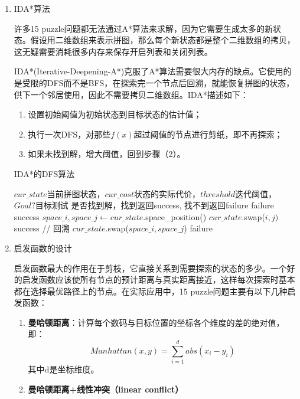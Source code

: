 \documentclass[10pt,letterpaper]{ctexart}
\begin{document}
\begin{enumerate}[itemindent=2.5em,label=\arabic*、]
    \item IDA*算法
    \par \qquad 许多15 puzzle问题都无法通过A*算法来求解，因为它需要生成太多的新状态。假设用二维数组来表示拼图，那么每个新状态都是整个二维数组的拷贝，这无疑需要消耗很多内存来保存开启列表和关闭列表。
    \par \qquad IDA*(Iterative-Deepening-A*)克服了A*算法需要很大内存的缺点。它使用的是受限的DFS而不是BFS，在探索完一个节点后回溯，就能恢复拼图的状态，供下一个邻居使用，因此不需要拷贝二维数组。IDA*描述如下：
    \begin{enumerate}[itemindent=1.5em,label=（\arabic*）]
        \item 设置初始阈值为初始状态到目标状态的估计值；
        \item 执行一次DFS，对那些$f(x)$超过阈值的节点进行剪纸，即不再探索；
        \item 如果未找到解，增大阈值，回到步骤（2）。
    \end{enumerate}

    \begin{algorithm}
      \caption{IDA*的DFS算法}
        \begin{algorithmic}[1] %
          \Require $cur\_state$当前拼图状态，$cur\_cost$状态的实际代价，$threshold$迭代阈值，$Goal?$目标测试
          \Ensure 是否找到解，找到返回success, 找不到返回failure
                \State \Return failure
              \EndIf
                \State \Return success
              \EndIf
              \State $space\_i, space\_j \gets cur\_state$.space\_position()
                \State $cur\_state$.swap($i, j)$
                  \State \Return success
                \EndIf
                \State // 回溯
                \State $cur\_state$.swap($space\_i, space\_j$)
              \EndFor
              \State \Return failure
            \EndFunction
        \end{algorithmic}
    \end{algorithm}
    \item 启发函数的设计
    \par \qquad 启发函数最大的作用在于剪枝，它直接关系到需要探索的状态的多少。一个好的启发函数应该使所有节点的预计距离与真实距离接近，这样每次探索时基本都在选择最优路径上的节点。在实际应用中，15 puzzle问题主要有以下几种启发函数：
    \begin{enumerate}[itemindent=1.5em,label=（\arabic*）]
      \item \textbf{曼哈顿距离}：计算每个数码与目标位置的坐标各个维度的差的绝对值，即：
      \begin{equation}
        Manhattan(x,y) = \sum_{i=1}^d abs(x_i - y_i)
      \end{equation}
      其中d是坐标维度。
      \item \textbf{曼哈顿距离+线性冲突（linear conflict）}


\end{enumerate}
\end{enumerate}
\end{document}
